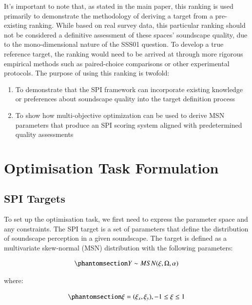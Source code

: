\documentclass[
  authoryear,
  preprint,
  3p]{elsarticle}
\providecommand{\tightlist}{%
  \setlength{\itemsep}{0pt}\setlength{\parskip}{0pt}}\usepackage{longtable,booktabs,array}
\begin{document}
It's important to note that, as stated in the main paper, this ranking
is used primarily to demonstrate the methodology of deriving a target
from a pre-existing ranking. While based on real survey data, this
particular ranking should not be considered a definitive assessment of
these spaces' soundscape quality, due to the mono-dimensional nature of
the SSS01 question. To develop a true reference target, the ranking
would need to be arrived at through more rigorous empirical methods such
as paired-choice comparisons or other experimental protocols. The
purpose of using this ranking is twofold:

\begin{enumerate}
\def\labelenumi{\arabic{enumi}.}
\tightlist
\item
  To demonstrate that the SPI framework can incorporate existing
  knowledge or preferences about soundscape quality into the target
  definition process
\item
  To show how multi-objective optimization can be used to derive MSN
  parameters that produce an SPI scoring system aligned with
  predetermined quality assessments
\end{enumerate}

\section{Optimisation Task
Formulation}\label{optimisation-task-formulation}

\subsection{SPI Targets}\label{sec-targets}

To set up the optimisation task, we first need to express the parameter
space and any constraints. The SPI target is a set of parameters that
define the distribution of soundscape perception in a given soundscape.
The target is defined as a multivariate skew-normal (MSN) distribution
with the following parameters:

\begin{equation}\phantomsection\label{eq-target}{
Y \sim MSN(\xi, \Omega, \alpha)
}\end{equation}

where:

\begin{equation}\phantomsection\label{eq-target-xi}{
\xi = (\xi_x, \xi_y), -1 \leq \xi \leq 1
}\end{equation}
\end{document}

